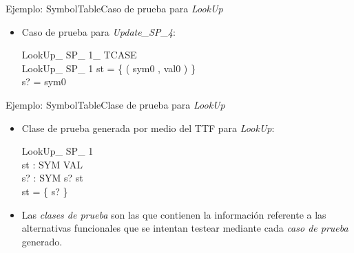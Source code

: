 \documentclass{beamer}
\begin{document}
      \begin{frame}{Ejemplo: SymbolTable}{Caso de prueba para \emph{LookUp}}
        \begin{itemize}
          \vspace{-.5cm}
          \item{
            Caso de prueba para \emph{Update\_SP\_4}:\\
            \vspace{-.5cm}
            \begin{schema}{LookUp\_ SP\_ 1\_ TCASE}\\
              LookUp\_ SP\_ 1 
              \where
              st = \{ ( sym0 , val0 ) \} \\
              s? = sym0
            \end{schema}
          }
        \end{itemize}
      \end{frame}
                  										
      \begin{frame}{Ejemplo: SymbolTable}{Clase de prueba para \emph{LookUp}}
        \begin{itemize}
          \item{
            Clase de prueba generada por medio del TTF para \emph{LookUp}:\\
            \vspace{-.5cm}
            \begin{schema}{LookUp\_ SP\_ 1}\\
              st : SYM \pfun VAL \\
              s? : SYM 
              \where
              s? \in \dom st \\
              \dom st = \{ s? \}
            \end{schema}
          }
                              																
          \item{
            Las \emph{clases de prueba} son las que contienen la información referente a las alternativas funcionales que se intentan testear mediante cada \emph{caso de prueba} generado.
          }
                              																    	
        \end{itemize}
      \end{frame}
                  										
\end{document}
